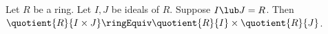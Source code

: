 
%
\begin{theorem}
  Let $R$ be a ring.
  Let $I,J$ be ideals of $R$.
  Suppose $I\lub J = R$.
  Then $\quotient{R}{I\times J}\ringEquiv\quotient{R}{I}\times\quotient{R}{J}$.
\end{theorem}
